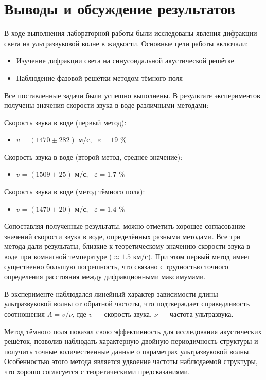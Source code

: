 \section{Выводы и обсуждение результатов}

В ходе выполнения лабораторной работы были исследованы явления дифракции света на ультразвуковой волне в жидкости. Основные цели работы включали:
\begin{itemize}
    \item Изучение дифракции света на синусоидальной акустической решётке
    \item Наблюдение фазовой решётки методом тёмного поля
\end{itemize}

Все поставленные задачи были успешно выполнены. В результате экспериментов получены значения скорости звука в воде различными методами:

Скорость звука в воде (первый метод):
\begin{itemize}
    \item $v = (1470 \pm 282)$ м/с, \ $\varepsilon = 19$ \% 
\end{itemize}

Скорость звука в воде (второй метод, среднее значение):
\begin{itemize}
    \item $v = (1509 \pm 25)$ м/с, \ $\varepsilon = 1.7$ \% 
\end{itemize}

Скорость звука в воде (метод тёмного поля):
\begin{itemize}
    \item $v = (1470 \pm 20)$ м/с, \ $\varepsilon = 1.4$ \% 
\end{itemize}

Сопоставляя полученные результаты, можно отметить хорошее согласование значений скорости звука в воде, определённых разными методами. Все три метода дали результаты, близкие к теоретическому значению скорости звука в воде при комнатной температуре ($\approx 1.5$ км/с). При этом первый метод имеет существенно большую погрешность, что связано с трудностью точного определения расстояния между дифракционными максимумами.

В эксперименте наблюдался линейный характер зависимости длины ультразвуковой волны от обратной частоты, что подтверждает справедливость соотношения $\Lambda = v/\nu$, где $v$ — скорость звука, $\nu$ — частота ультразвука.

Метод тёмного поля показал свою эффективность для исследования акустических решёток, позволив наблюдать характерную двойную периодичность структуры и получить точные количественные данные о параметрах ультразвуковой волны. Особенностью этого метода является удвоение частоты наблюдаемой структуры, что хорошо согласуется с теоретическими предсказаниями.
